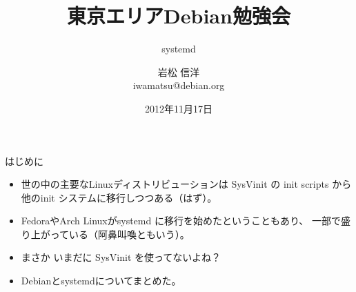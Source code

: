 \title{東京エリアDebian勉強会}
\subtitle{systemd}
\author{岩松 信洋\\iwamatsu@debian.org}
\date{2012年11月17日}



\frame{\titlepage{}}

%
%
%

\begin{frame}{はじめに}

\begin{itemize}
\item 世の中の主要なLinuxディストリビューションは 
SysVinit の init scripts から他のinit システムに移行しつつある（はず）。
\item FedoraやArch Linuxがsystemd に移行を始めたということもあり、
一部で盛り上がっている（阿鼻叫喚ともいう）。
\item まさか いまだに SysVinit を使ってないよね？
\item Debianとsystemdについてまとめた。
\end{itemize}

\end{frame}

